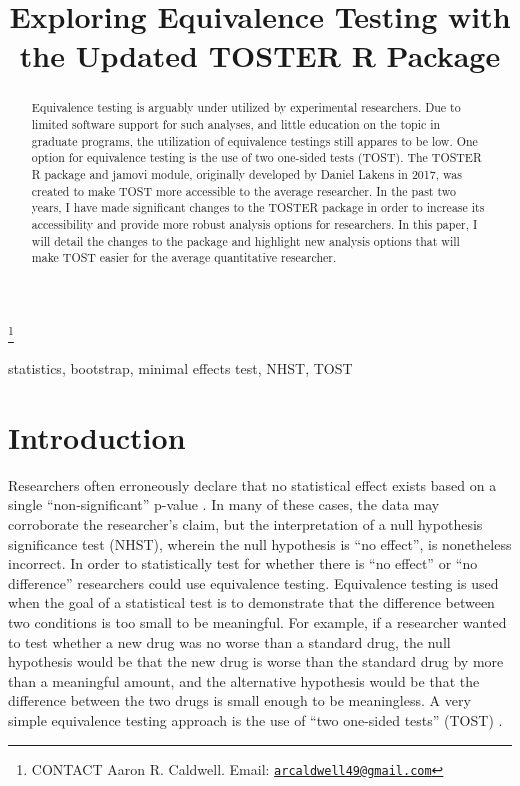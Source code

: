 \documentclass[]{interact}
\theoremstyle{plain}%
\theoremstyle{definition}
\theoremstyle{remark}
\begin{document}

\title{Exploring Equivalence Testing with the Updated TOSTER R Package}


\author{
}

\thanks{CONTACT Aaron R.
Caldwell. Email: \href{mailto:arcaldwell49@gmail.com}{\nolinkurl{arcaldwell49@gmail.com}}}

\maketitle

\begin{abstract}
Equivalence testing is arguably under utilized by experimental
researchers. Due to limited software support for such analyses, and
little education on the topic in graduate programs, the utilization of
equivalence testings still appares to be low. One option for equivalence
testing is the use of two one-sided tests (TOST). The TOSTER R package
and jamovi module, originally developed by Daniel Lakens in 2017, was
created to make TOST more accessible to the average researcher. In the
past two years, I have made significant changes to the TOSTER package in
order to increase its accessibility and provide more robust analysis
options for researchers. In this paper, I will detail the changes to the
package and highlight new analysis options that will make TOST easier
for the average quantitative researcher.
\end{abstract}

\begin{keywords}
statistics, bootstrap, minimal effects test, NHST, TOST
\end{keywords}

\hypertarget{introduction}{%
\section{Introduction}\label{introduction}}

Researchers often erroneously declare that no statistical effect exists
based on a single ``non-significant'' p-value \citep{blandaltman95}. In
many of these cases, the data may corroborate the researcher's claim,
but the interpretation of a null hypothesis significance test (NHST),
wherein the null hypothesis is ``no effect'', is nonetheless incorrect.
In order to statistically test for whether there is ``no effect'' or
``no difference'' researchers could use equivalence testing. Equivalence
testing is used when the goal of a statistical test is to demonstrate
that the difference between two conditions is too small to be
meaningful. For example, if a researcher wanted to test whether a new
drug was no worse than a standard drug, the null hypothesis would be
that the new drug is worse than the standard drug by more than a
meaningful amount, and the alternative hypothesis would be that the
difference between the two drugs is small enough to be meaningless. A
very simple equivalence testing approach is the use of ``two one-sided
tests'' (TOST) \citep{schuirmann1987}.
\end{document}
